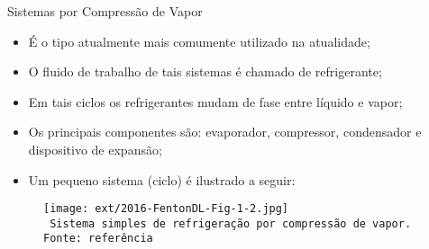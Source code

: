     \begin{frame}{Sistemas por Compressão de Vapor}\vspace*{-0em}
        \begin{itemize}
            \item<1-> É o tipo atualmente \alert{mais comumente utilizado} na atualidade;
                \\[\medskipamount]
            \item<2-> O \alert{fluido de trabalho} de tais sistemas é chamado de
                \alert{refrigerante};
                \\[\medskipamount]
            \item<3-> Em tais ciclos os refrigerantes \alert{mudam de fase} entre
                \alert{líquido} e \alert{vapor};
                \\[\medskipamount]
            \item<4-> Os principais componentes são: \alert{evaporador}, \alert{compressor},
                \alert{condensador} e \alert{dispositivo de expansão};
                \\[\medskipamount]
            \item<5-> Um pequeno sistema (\alert{ciclo}) é ilustrado a seguir:
        \end{itemize}
    \end{frame}
    \begin{frame}\vspace*{-0em}
        \begin{center}
            \begin{figure}
                \fontsize{3.0}{4}\selectfont
                \texttt{[image: ext/2016-FentonDL-Fig-1-2.jpg]}
                \\\vspace*{-0.0em}\texttt{%
                    Sistema simples de refrigeração por compressão de vapor.\\
                    Fonte: referência~\cite{2016-FentonDL-ASHRAE}
                }
            \end{figure}
        \end{center}
    \end{frame}

